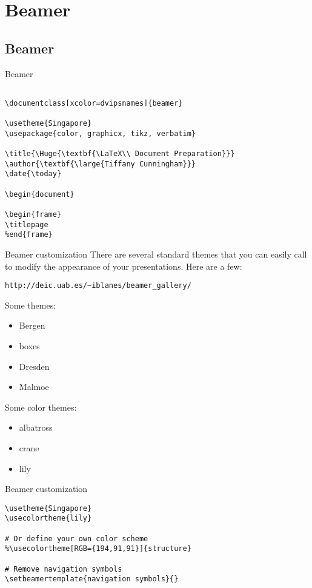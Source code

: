 \documentclass[xcolor=dvipsnames]{beamer}
\begin{document}
\section{Beamer}
\subsection{Beamer}

\begin{frame}[fragile]{Beamer}
\begin{verbatim}

\documentclass[xcolor=dvipsnames]{beamer}

\usetheme{Singapore}
\usepackage{color, graphicx, tikz, verbatim} 

\title{\Huge{\textbf{\LaTeX\\ Document Preparation}}}
\author{\textbf{\large{Tiffany Cunningham}}}
\date{\today}

\begin{document}

\begin{frame}
\titlepage
%end{frame}

\end{verbatim}

\end{frame}

\begin{frame}[fragile]{Beamer customization}
There are several standard themes that you can easily call to modify the appearance of your presentations. Here are a few:\\
\begin{verbatim}
http://deic.uab.es/~iblanes/beamer_gallery/
\end{verbatim}
Some themes:
\begin{itemize}
	\item Bergen
	\item boxes
	\item Dresden
	\item Malmoe
\end{itemize}
Some color themes:
\begin{itemize}
	\item albatross
	\item crane
	\item lily
\end{itemize}	
\end{frame}

\begin{frame}[fragile]{Beamer customization}
\begin{verbatim}
\usetheme{Singapore}
\usecolortheme{lily}

# Or define your own color scheme
%\usecolortheme[RGB={194,91,91}]{structure}

# Remove navigation symbols
\setbeamertemplate{navigation symbols}{}

\end{verbatim}
\end{frame}
\end{document}
